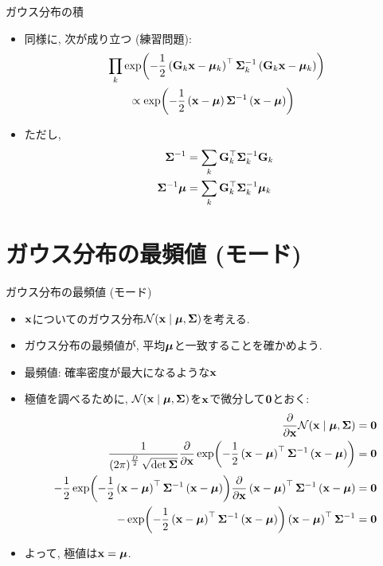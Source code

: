 \documentclass[dvipdfmx,notheorems,t]{beamer}
\begin{document}
\begin{frame}{ガウス分布の積}
\begin{itemize}
  \item 同様に, 次が成り立つ (練習問題):
  \begin{align*}
    & \prod_k \exp(-\frac{1}{2} \left( \vb{G}_k \vb{x} - \vb*{\mu}_k \right)^\top
      \vb{\Sigma}_k^{-1} \left( \vb{G}_k \vb{x} - \vb*{\mu}_k \right)) \\
    & \qquad \propto \exp(-\frac{1}{2} \left( \vb{x} - \vb*{\mu} \right) \vb{\Sigma}^{-1}
      \left( \vb{x} - \vb*{\mu} \right))
  \end{align*}
  \item ただし,
  \begin{align*}
    \vb{\Sigma}^{-1} &= \sum_k \vb{G}_k^\top \vb{\Sigma}_k^{-1} \vb{G}_k \\
    \vb{\Sigma}^{-1} \vb*{\mu} &= \sum_k \vb{G}_k^\top \vb{\Sigma}_k^{-1} \vb*{\mu}_k
  \end{align*}
\end{itemize}
\end{frame}

\section{ガウス分布の最頻値 (モード)}

\begin{frame}{ガウス分布の最頻値 (モード)}
\begin{itemize}
  \item $\vb{x}$についてのガウス分布$\mathcal{N}(\vb{x} \mid \vb*{\mu}, \vb{\Sigma})$を考える.
  \item ガウス分布の最頻値が, 平均$\vb*{\mu}$と一致することを確かめよう.
  \item 最頻値: 確率密度が最大になるような$\vb{x}$
  \item 極値を調べるために, $\mathcal{N}(\vb{x} \mid \vb*{\mu}, \vb{\Sigma})$を$\vb{x}$で微分して$\vb{0}$とおく:
  {\small \begin{align*}
    \pdv{\vb{x}} \mathcal{N}(\vb{x} \mid \vb*{\mu}, \vb{\Sigma}) &= \vb{0} \\
    \frac{1}{\left( 2\pi \right)^\frac{D}{2} \sqrt{\det \vb{\Sigma}}}
      \pdv{\vb{x}} \exp(-\frac{1}{2} \left( \vb{x} - \vb*{\mu} \right)^\top \vb{\Sigma}^{-1}
      \left( \vb{x} - \vb*{\mu} \right)) &= \vb{0} \\
    -\frac{1}{2} \exp(-\frac{1}{2} \left( \vb{x} - \vb*{\mu} \right)^\top \vb{\Sigma}^{-1}
      \left( \vb{x} - \vb*{\mu} \right))
    \pdv{\vb{x}} \left( \vb{x} - \vb*{\mu} \right)^\top \vb{\Sigma}^{-1}
      \left( \vb{x} - \vb*{\mu} \right) &= \vb{0} \\
    -\exp(-\frac{1}{2} \left( \vb{x} - \vb*{\mu} \right)^\top \vb{\Sigma}^{-1}
      \left( \vb{x} - \vb*{\mu} \right)) \left( \vb{x} - \vb*{\mu} \right)^\top \vb{\Sigma}^{-1} &= \vb{0}
  \end{align*}}
  \item よって, 極値は$\vb{x} = \vb*{\mu}$.
\end{itemize}
\end{frame}
\end{document}
